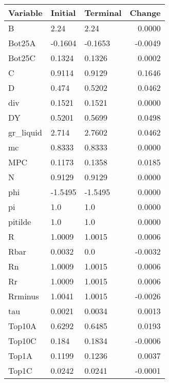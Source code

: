 \begin{table}
\centering
\label{tab:stst_comparison_low_B_wedge_permanent_asymmetric}
\begin{tabular}{lllr}
\toprule
                Variable & Initial & Terminal &  Change \\
\midrule
                       B &    2.24 &     2.24 &  0.0000 \\
                  Bot25A & -0.1604 &  -0.1653 & -0.0049 \\
                  Bot25C &  0.1324 &   0.1326 &  0.0002 \\
                       C &  0.9114 &   0.9129 &  0.1646 \\
                       D &   0.474 &   0.5202 &  0.0462 \\
                     div &  0.1521 &   0.1521 &  0.0000 \\
                      DY &  0.5201 &   0.5699 &  0.0498 \\
               gr\_liquid &   2.714 &   2.7602 &  0.0462 \\
                      mc &  0.8333 &   0.8333 &  0.0000 \\
                     MPC &  0.1173 &   0.1358 &  0.0185 \\
                       N &  0.9129 &   0.9129 &  0.0000 \\
                     phi & -1.5495 &  -1.5495 &  0.0000 \\
                      pi &     1.0 &      1.0 &  0.0000 \\
                 pitilde &     1.0 &      1.0 &  0.0000 \\
                       R &  1.0009 &   1.0015 &  0.0006 \\
                    Rbar &  0.0032 &      0.0 & -0.0032 \\
                      Rn &  1.0009 &   1.0015 &  0.0006 \\
                      Rr &  1.0009 &   1.0015 &  0.0006 \\
                 Rrminus &  1.0041 &   1.0015 & -0.0026 \\
                     tau &  0.0021 &   0.0034 &  0.0013 \\
                  Top10A &  0.6292 &   0.6485 &  0.0193 \\
                  Top10C &   0.184 &   0.1834 & -0.0006 \\
                   Top1A &  0.1199 &   0.1236 &  0.0037 \\
                   Top1C &  0.0242 &   0.0241 & -0.0001 \\

\end{tabular}
\end{table}
